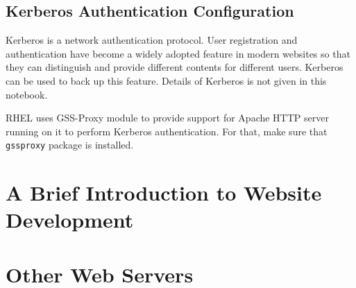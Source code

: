 \subsection{Kerberos Authentication Configuration}

Kerberos is a network authentication protocol. User registration and authentication have become a widely adopted feature in modern websites so that they can distinguish and provide different contents for different users. Kerberos can be used to back up this feature. Details of Kerberos is not given in this notebook. 

RHEL uses GSS-Proxy module to provide support for Apache HTTP server running on it to perform Kerberos authentication. For that, make sure that \verb|gssproxy| package is installed. 




\section{A Brief Introduction to Website Development}










\section{Other Web Servers}